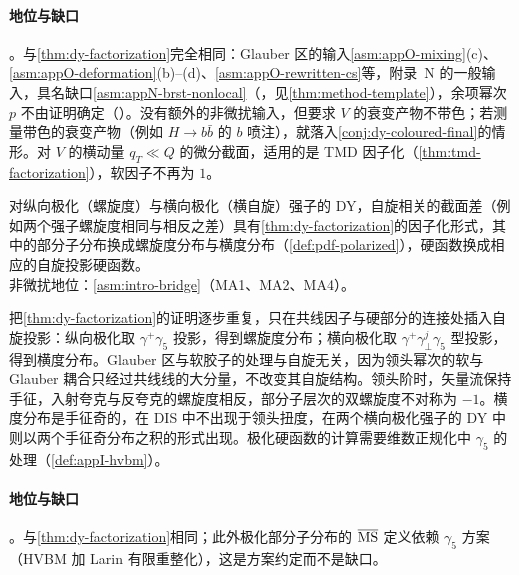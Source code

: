 \paragraph{地位与缺口}\tagA。与\cref{thm:dy-factorization}完全相同：Glauber 区的输入\cref{asm:appO-mixing}(c)、\cref{asm:appO-deformation}(b)--(d)、\cref{asm:appO-rewritten-cs}等，附录~N 的一般输入，具名缺口\cref{asm:appN-brst-nonlocal}（\tagC，见\cref{thm:method-template}），余项幂次 $p$ 不由证明确定（\tagC）。没有额外的非微扰输入，但要求 $V$ 的衰变产物不带色；若测量带色的衰变产物（例如 $H\to b\bar b$ 的 $b$ 喷注），就落入\cref{conj:dy-coloured-final}的情形。对 $V$ 的横动量 $q_T\ll Q$ 的微分截面，适用的是 TMD 因子化（\cref{thm:tmd-factorization}），软因子不再为 $1$。

\begin{theorem}\label{thm:dy-polarized}
对纵向极化（螺旋度）与横向极化（横自旋）强子的 DY，自旋相关的截面差（例如两个强子螺旋度相同与相反之差）具有\cref{thm:dy-factorization}的因子化形式，其中的部分子分布换成螺旋度分布与横度分布（\cref{def:pdf-polarized}），硬函数换成相应的自旋投影硬函数。\\
非微扰地位：\cref{asm:intro-bridge}（MA1、MA2、MA4）。
\end{theorem}

\begin{proofsketch}
把\cref{thm:dy-factorization}的证明逐步重复，只在共线因子与硬部分的连接处插入自旋投影：纵向极化取 $\gamma^+\gamma_5$ 投影，得到螺旋度分布；横向极化取 $\gamma^+\gamma^j_\perp\gamma_5$ 型投影，得到横度分布。Glauber 区与软胶子的处理与自旋无关，因为领头幂次的软与 Glauber 耦合只经过共线线的大分量，不改变其自旋结构。领头阶时，矢量流保持手征，入射夸克与反夸克的螺旋度相反，部分子层次的双螺旋度不对称为 $-1$。横度分布是手征奇的，在 DIS 中不出现于领头扭度，在两个横向极化强子的 DY 中则以两个手征奇分布之积的形式出现\cite{RalstonSoper1979,JaffeJi1991}。极化硬函数的计算需要维数正规化中 $\gamma_5$ 的处理（\cref{def:appI-hvbm}）。
\end{proofsketch}

\paragraph{地位与缺口}\tagA。与\cref{thm:dy-factorization}相同；此外极化部分子分布的 $\overline{\mathrm{MS}}$ 定义依赖 $\gamma_5$ 方案（HVBM 加 Larin 有限重整化），这是方案约定而不是缺口。

